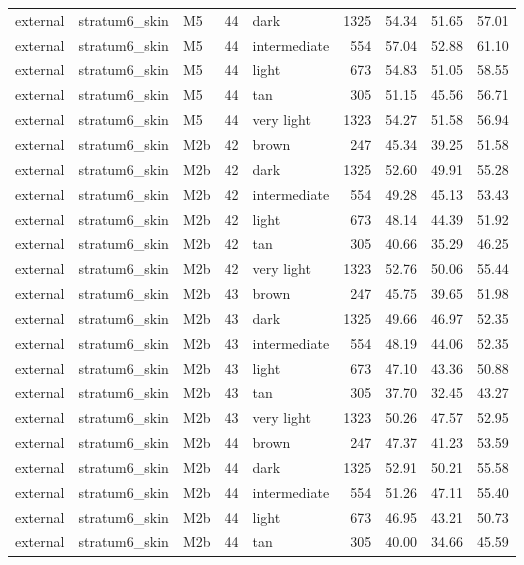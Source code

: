 \begin{tabular}{lllrlrrrr}
external & stratum6\_skin & M5 & 44 & dark & 1325 & 54.34 & 51.65 & 57.01 \\
external & stratum6\_skin & M5 & 44 & intermediate & 554 & 57.04 & 52.88 & 61.10 \\
external & stratum6\_skin & M5 & 44 & light & 673 & 54.83 & 51.05 & 58.55 \\
external & stratum6\_skin & M5 & 44 & tan & 305 & 51.15 & 45.56 & 56.71 \\
external & stratum6\_skin & M5 & 44 & very light & 1323 & 54.27 & 51.58 & 56.94 \\
external & stratum6\_skin & M2b & 42 & brown & 247 & 45.34 & 39.25 & 51.58 \\
external & stratum6\_skin & M2b & 42 & dark & 1325 & 52.60 & 49.91 & 55.28 \\
external & stratum6\_skin & M2b & 42 & intermediate & 554 & 49.28 & 45.13 & 53.43 \\
external & stratum6\_skin & M2b & 42 & light & 673 & 48.14 & 44.39 & 51.92 \\
external & stratum6\_skin & M2b & 42 & tan & 305 & 40.66 & 35.29 & 46.25 \\
external & stratum6\_skin & M2b & 42 & very light & 1323 & 52.76 & 50.06 & 55.44 \\
external & stratum6\_skin & M2b & 43 & brown & 247 & 45.75 & 39.65 & 51.98 \\
external & stratum6\_skin & M2b & 43 & dark & 1325 & 49.66 & 46.97 & 52.35 \\
external & stratum6\_skin & M2b & 43 & intermediate & 554 & 48.19 & 44.06 & 52.35 \\
external & stratum6\_skin & M2b & 43 & light & 673 & 47.10 & 43.36 & 50.88 \\
external & stratum6\_skin & M2b & 43 & tan & 305 & 37.70 & 32.45 & 43.27 \\
external & stratum6\_skin & M2b & 43 & very light & 1323 & 50.26 & 47.57 & 52.95 \\
external & stratum6\_skin & M2b & 44 & brown & 247 & 47.37 & 41.23 & 53.59 \\
external & stratum6\_skin & M2b & 44 & dark & 1325 & 52.91 & 50.21 & 55.58 \\
external & stratum6\_skin & M2b & 44 & intermediate & 554 & 51.26 & 47.11 & 55.40 \\
external & stratum6\_skin & M2b & 44 & light & 673 & 46.95 & 43.21 & 50.73 \\
external & stratum6\_skin & M2b & 44 & tan & 305 & 40.00 & 34.66 & 45.59 \\

\end{tabular}
